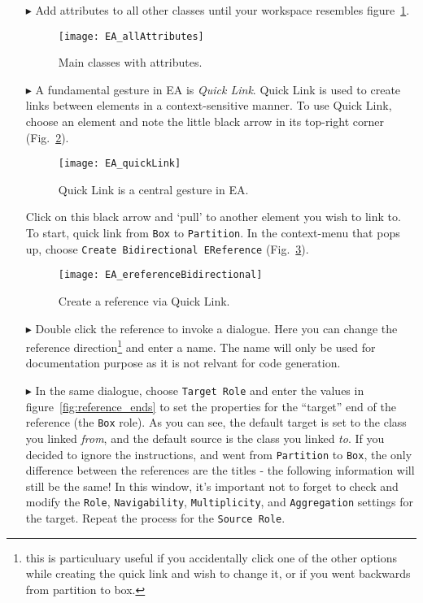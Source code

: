 \begin{itemize}
\pagebreak

\item[$\blacktriangleright$] Add attributes to all other classes until your workspace resembles figure~\ref{fig:attribute_completed}.

\begin{figure}[htbp]
	\centering
  \texttt{[image: EA\_allAttributes]}
	\caption{Main classes with attributes.}
	\label{fig:attribute_completed}
\end{figure}
\FloatBarrier


\item[$\blacktriangleright$] A fundamental gesture in EA is \emph{Quick Link}.
Quick Link is used to create links between elements in a context-sensitive manner.
To use Quick Link, choose an element and note the little black arrow in its top-right corner (Fig.~\ref{fig:quicklink}).

\begin{figure}[htbp]
	\centering
  \texttt{[image: EA\_quickLink]}
	\caption{Quick Link is a central gesture in EA.}
	\label{fig:quicklink}
\end{figure}
\FloatBarrier

\pagebreak

Click on this black arrow and `pull' to another element you wish to link to.
To start, quick link from \texttt{Box} to \texttt{Partition}.
In the context-menu that pops up, choose \texttt{Create Bidirectional EReference} (Fig.~\ref{fig:ereference}).

\begin{figure}[htbp]
	\centering
  \texttt{[image: EA\_ereferenceBidirectional]}
	\caption{Create a reference via Quick Link.}
	\label{fig:ereference}
\end{figure}
\FloatBarrier

\item[$\blacktriangleright$] Double click the reference to invoke a dialogue.
Here you can change the reference direction\footnote{this is particuluary useful if you accidentally click one of the other options while creating the quick link and wish to change it, or if you went backwards from partition to box.} and enter a name. The name will only be used for documentation purpose as it is not relvant for code generation.

\item[$\blacktriangleright$] In the same dialogue, choose \texttt{Target Role} and enter the values in figure~\ref{fig:reference_ends} to set the properties for the ``target'' end of the reference (the \texttt{Box} role). As you can see, the default target is set to the class you linked \emph{from}, and the default source is the class you linked \emph{to}. If you decided to ignore the instructions, and went from \texttt{Partition} to \texttt{Box}, the only difference between the references are the titles - the following information will still be the same! In this window, it's important not to forget to check and modify the \texttt{Role}, \texttt{Navigability}, \texttt{Multiplicity}, and \texttt{Aggregation} settings for the target.  Repeat the process for the \texttt{Source Role}.


\end{itemize}
